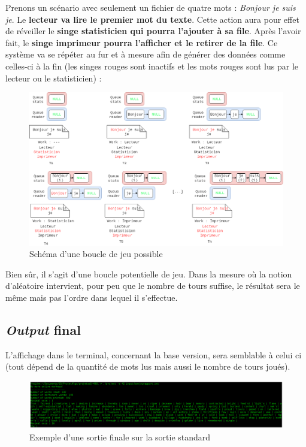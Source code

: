 \documentclass{article}
\begin{document}
Prenons un scénario avec seulement un fichier de quatre mots : \textit{Bonjour je suis je}. Le \textbf{lecteur va lire le premier mot du texte}. Cette action aura pour effet de réveiller le \textbf{singe statisticien qui pourra l'ajouter à sa file}. Après l'avoir fait, le \textbf{singe imprimeur pourra l'afficher et le retirer de la file}.
Ce système va se répéter au fur et à mesure afin de générer des données comme celles-ci à la fin (les singes rouges sont inactifs et les mots rouges sont lus par le lecteur ou le statisticien) :

\begin{figure}[ht!]
\centering
\includegraphics[scale=0.35]{game.png}
\caption{Schéma d'une boucle de jeu possible}
\label{fig:game}
\end{figure}

Bien sûr, il s'agit d'une boucle potentielle de jeu. Dans la mesure où la notion d'aléatoire intervient, pour peu que le nombre de tours suffise, le résultat sera le même mais pas l'ordre dans lequel il s'effectue.


\subsection{\textit{Output} final}
\label{subsct:output_final}

L'affichage dans le terminal, concernant la base version, sera semblable à celui ci (tout dépend de la quantité de mots lus mais aussi le nombre de tours joués).

\begin{figure}[ht!]
\centering
\includegraphics[scale=0.29]{output.png}
\caption{Exemple d'une sortie finale sur la sortie standard}
\label{fig:output}
\end{figure}
\end{document}

